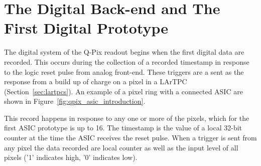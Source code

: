 \section{The Digital Back-end and The First Digital Prototype}\label{sec:digital_prototype}
The digital system of the Q-Pix readout begins when the first digital data are recorded.
This occurs during the collection of a recorded timestamp in response to the logic reset pulse from analog front-end.
These triggers are a sent as the response from a build up of charge on a pixel in a LArTPC (Section~\ref{sec:lartpcs}).
An example of a pixel ring with a connected ASIC are shown in Figure~\ref{fig:qpix_asic_introduction}.

This record happens in response to any one or more of the pixels, which for the first ASIC prototype is up to 16.
The timestamp is the value of a local 32-bit counter at the time the ASIC receives the reset pulse.
When a trigger is sent from any pixel the data recorded are local counter as well as the input level of all pixels ('1' indicates high, '0' indicates low).

